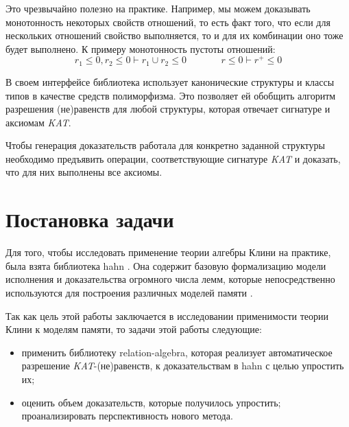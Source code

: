 \documentclass[times
              ,specification
              ,annotation
              ]{itmo-student-thesis}
\begin{document}
      Это чрезвычайно полезно на практике.
      Например, мы можем доказывать монотонность некоторых свойств отношений,
      то есть факт того, что если для нескольких отношений свойство выполняется, то и для их
      комбинации оно тоже будет выполнено.
      К примеру монотонность пустоты отношений:
      $$ r_1 \leq 0, r_2 \leq 0 \vdash r_1 \cup r_2 \leq 0 \;\;\;\;\;\;\;\;\;\;\;\;\; r \leq 0 \vdash r^+ \leq 0 $$

      В своем интерфейсе библиотека использует канонические структуры и классы типов
      \cite{canonical_structures} в качестве средств полиморфизма. Это позволяет ей обобщить алгоритм
      разрешения (не)равенств для любой структуры, которая отвечает сигнатуре и аксиомам \textit{KAT}.
      
      Чтобы генерация доказательств работала для конкретно заданной структуры необходимо предъявить
      операции, соответствующие сигнатуре \textit{KAT} и доказать, что для них выполнены все аксиомы.

\finishrelatedwork

  \section{Постановка задачи}


    Для того, чтобы исследовать применение теории алгебры Клини на практике, была взята библиотека hahn \cite{hahn}.
    Она содержит базовую формализацию модели исполнения и доказательства огромного числа лемм, которые
    непосредственно используются для построения различных моделей памяти \cite{imm}.

    Так как цель этой работы заключается в исследовании применимости теории Клини к моделям памяти,
    то задачи этой работы следующие:
    \begin{itemize}
      \item применить библиотеку relation-algebra, которая реализует автоматическое разрешение
        \textit{KAT}-(не)равенств, к доказательствам в hahn с целью упростить их;
      \item оценить объем доказательств, которые получилось упростить; проанализировать
        перспективность нового метода.
    \end{itemize}
\end{document}
